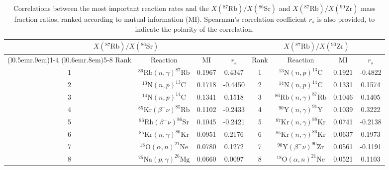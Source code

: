 \begin{table}[t]
\centering
\caption{\label{tab:mutual_info}Correlations between the most important reaction rates and the $X(^{87}\mathrm{Rb})/X(^{86}\mathrm{Sr})$ and $X(^{87}\mathrm{Rb})/X(^{90}\mathrm{Zr})$ mass fraction ratios, ranked according to mutual information (MI). Spearman's correlation coefficient $r_{s}$ is also provided, to indicate the polarity of the correlation.}
\begin{tabular}{cccc|cccc}
\hline\midrule
\multicolumn{4}{c}{$X(^{87}\mathrm{Rb})/X(^{86}\mathrm{Sr})$}&
\multicolumn{4}{c}{$X(^{87}\mathrm{Rb})/X(^{90}\mathrm{Zr})$}\\
\cmidrule[0.05pt](l{0.5em}r{.9em}){1-4} \cmidrule[0.1pt](l{0.6em}r{.8em}){5-8}
Rank&Reaction&MI&$r_{s}$&Rank&Reaction&MI&$r_{s}$\\ \midrule
1&$^{86}\mathrm{Rb}(n,\gamma)^{87}\mathrm{Rb}$&0.1967&0.4347
&1&$^{13}\mathrm{N}(n,p)^{13}\mathrm{C}$&0.1921&-0.4822\\
2&$^{13}\mathrm{N}(n,p)^{13}\mathrm{C}$&0.1718&-0.4450
&2&$^{14}\mathrm{N}(n,p)^{14}\mathrm{C}$&0.1331&0.1574\\
3&$^{14}\mathrm{N}(n,p)^{14}\mathrm{C}$&0.1341&0.1518
&3&$^{86}\mathrm{Rb}(n,\gamma)^{87}\mathrm{Rb}$&0.1046&0.1405\\
4&$^{85}\mathrm{Kr}(\beta^{-}\nu)^{85}\mathrm{Rb}$&0.1102&-0.2433
&4&$^{90}\mathrm{Y}(n,\gamma)^{91}\mathrm{Y}$&0.1039&0.3222\\
5&$^{86}\mathrm{Rb}(\beta^{-}\nu)^{86}\mathrm{Sr}$&0.1045&-0.2421
&5&$^{87}\mathrm{Kr}(n,\gamma)^{88}\mathrm{Kr}$&0.0741&-0.2138\\
6&$^{85}\mathrm{Kr}(n,\gamma)^{86}\mathrm{Kr}$&0.0951&0.2176
&6&$^{85}\mathrm{Kr}(n,\gamma)^{86}\mathrm{Kr}$&0.0637&0.1973\\
7&$^{18}\mathrm{O}(\alpha,n)^{21}\mathrm{Ne}$&0.0780&0.1272
&7&$^{90}\mathrm{Y}(\beta^{-}\nu)^{90}\mathrm{Zr}$&0.0561&-0.1191\\
8&$^{25}\mathrm{Na}(p,\gamma)^{26}\mathrm{Mg}$&0.0660&0.0097
&8&$^{18}\mathrm{O}(\alpha,n)^{21}\mathrm{Ne}$&0.0521&0.1103\\
\hline\hline
\end{tabular}
\end{table}



